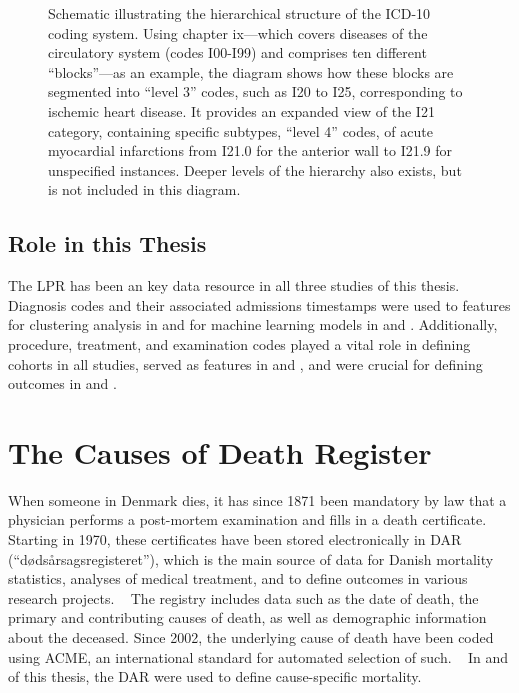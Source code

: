 \begin{figure}
\begin{tikzpicture}
\end{tikzpicture}
\caption[Hierarchical structure of \acs{ICD-10} codes]{%
    Schematic illustrating the hierarchical structure of the \ac{ICD-10} coding
    system. 
    Using chapter ix---which covers diseases of the circulatory system
    (codes I00-I99) and comprises ten different \enquote{blocks}---as an example, 
    the diagram shows how these blocks are segmented into 
    \enquote{level 3} codes, such as I20 to I25, 
    corresponding to ischemic heart disease. 
    It provides an expanded view of the I21 category, 
    containing specific subtypes, \enquote{level 4} codes, 
    of acute myocardial infarctions 
    from I21.0 for the anterior wall 
    to I21.9 for unspecified instances. 
    Deeper levels of the hierarchy also exists,
    but is not included in this diagram.
}
\label{fig:icd10-hierarchy}
\end{figure}

\subsection{Role in this Thesis}

The \ac{LPR} has been an key data resource in all three studies of this thesis. 
Diagnosis codes and their associated admissions timestamps were used to 
features for clustering analysis in \studyi{} 
and for machine learning models in \studyii{} and \studyiii{}.
Additionally, procedure, treatment, and examination codes played a vital role 
in defining cohorts in all studies, 
served as features in \studyii{} and \studyiii{},
and were crucial for defining outcomes in \studyi{} and \studyiii{}.

\section{The Causes of Death Register}

When someone in Denmark dies, 
it has since 1871 been mandatory by law that a physician
performs a post-mortem examination and fills in a death certificate.
~\autocite{helweg-larsenDanish2011}
Starting in 1970, these certificates have been stored electronically 
in \ac{DAR} (\enquote{dødsårsagsregisteret}),
which is the main source of data for 
Danish mortality statistics,
analyses of medical treatment,
and to define outcomes in various research projects.
~\autocite{helweg-larsenDanish2011}
The registry includes data such as 
the date of death, the primary and contributing causes
of death, as well as demographic information about the deceased.
Since 2002, the underlying cause of death have been coded using \ac{ACME},
an international standard for automated selection of such.
~\autocite{helweg-larsenDanish2011}
In \studyi{} and \studyiii{} of this thesis, 
the \ac{DAR} were used to define cause-specific mortality.


